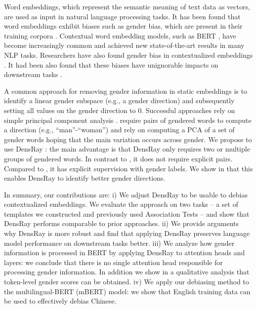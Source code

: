 Word embeddings, which represent the semantic meaning of
text data as vectors, are used as input in natural language
processing tasks. It has been found that word embeddings
exhibit biases such as gender bias, which are present in their training
corpora \cite{bolukbasi2016man,caliskan2017semantics,garg2018word}. Contextual word
embedding models, such as BERT \cite{devlin2018bert}, have
become increasingly common and achieved new state-of-the-art
results in many NLP tasks. Researchers have also found
gender bias in contextualized
embeddings \cite{zhao2019gender,may2019measuring}. It had been also found that these biases have unignorable impacts on downstream tasks \cite{vanmassenhove-etal-2018-getting,moryossef-etal-2019-filling,rudinger2018gender,zhao2018gender}.

A common approach for removing gender information in static
embeddings is to identify a linear gender subspace (e.g., a
gender direction) and subsequently setting all values on the
gender direction to 0. Successful approaches rely on simple
principal component
analysis \cite{bolukbasi2016man,mu2018all}. 
require pairs of gendered words to compute a direction
(e.g., ``man''-``woman'') and  rely on
computing a PCA of a set of gender words hoping that the
main variation occurs across gender. We propose to use
DensRay \cite{dufter2019analytical}: the main advantage is
that DensRay only requires two or multiple groups of
gendered words. In contrast to , it
does not require explicit pairs. Compared
to , it has explicit supervision with gender
labels. We show in  that this enables
DensRay to identify better gender directions.

In summary, our contributions are: 
i) We adjust DensRay to be usable to debias contextualized embeddings.
We evaluate the approach on two tasks -- a set of templates
we constructed and previously used Association Tests -- and show that DensRay performs comparable to prior approaches. 
ii) We provide arguments why DensRay is more robust and find that applying DensRay preserves language model performance on downstream tasks better.
iii) We analyze how gender information is processed in BERT by applying DensRay to attention heads and layers: we conclude that there is no single attention head responsible for processing gender information. In addition we show in a qualitative analysis that token-level gender scores can be obtained. 
iv) We apply our debiasing method to the multilingual-BERT (mBERT) model: we show that English training data can be used to effectively debias Chinese.

